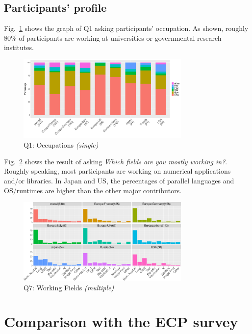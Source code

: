 \documentclass[preprint,5p,times]{elsarticle}
\def\myquote#1{{\it #1}}
\def\mcountries{major contributors}%
\begin{document}
\subsection*{Participants' profile}

Fig.~\ref{fig:occupations} shows the graph of Q1 asking participants'
occupation. As shown, roughly 80\% of participants are working at
universities or governmental research institutes.
%
\begin{figure}[htb]
  \begin{center}
    \includegraphics[width=8.5cm]{R-scripts/Q1.pdf}
    \caption{Q1: Occupations {\it(single)}}
    \label{fig:occupations}
  \end{center}
\end{figure}

Fig.~\ref{fig:working-fields} shows the result of asking \myquote{Which
fields are you mostly working in?}. Roughly speaking, most
participants are working on numerical applications and/or
libraries. In Japan and US, the percentages of parallel languages and
OS/runtimes are higher than the other \mcountries.

\begin{figure}[htb]
  \begin{center}
    \includegraphics[width=8.5cm]{R-scripts/Q7.pdf}
    \caption{Q7: Working Fields {\it(multiple)}}
    \label{fig:working-fields}
  \end{center}
\end{figure}

\section{Comparison with the ECP survey}\label{sec:ecp}
\end{document}
